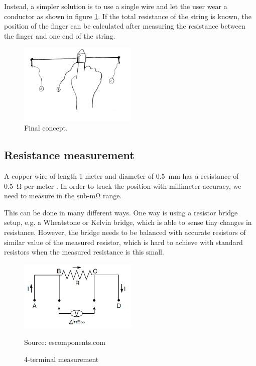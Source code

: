 \documentclass{article}
\newcommand{\source}[1]{\hfill \vspace{-15pt} \caption*{ \footnotesize Source: {#1}} }
\begin{document}
Instead, a simpler solution is to use a single wire and let the user wear a conductor as shown in figure \ref{fig:slidarr_final_concept}. If the total resistance of the string is known, the position of the finger can be calculated after measuring the resistance between the finger and one end of the string.

\begin{figure}[ht]
  \centering
  \includegraphics[width=0.5\textwidth]{slidarr_final_concept}
  \caption{Final concept.}
  \label{fig:slidarr_final_concept}
\end{figure}

\subsection{Resistance measurement} \label{sec:resistance_measurement}
A copper wire of length 1 meter and diameter of \SI{0.5}{mm} has a resistance of \SI{0.5}{\ohm} per meter \cite{copperresistance}. In order to track the position  with millimeter accuracy, we need to measure in the sub-\si{\milli\ohm} range. 

This can be done in many different ways. One way is using a resistor bridge setup, e.g. a Wheatstone or Kelvin bridge, which is able to sense tiny changes in resistance. However, the bridge needs to be balanced with accurate resistors of similar value of the measured resistor, which is hard to achieve with standard resistors when the measured resistance is this small.

\begin{figure}[ht]
  \centering
  \includegraphics[width=0.5\textwidth]{Kelvin_Connections}
  \caption{4-terminal measurement}
  \source{escomponents.com}
  \label{fig:4terminal}
\end{figure}
\end{document}
